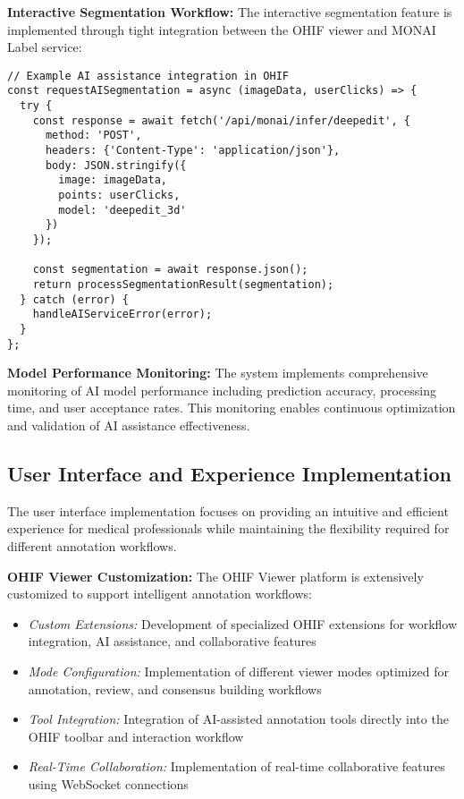 \textbf{Interactive Segmentation Workflow:} The interactive segmentation feature is implemented through tight integration between the OHIF viewer and MONAI Label service:

\begin{verbatim}
// Example AI assistance integration in OHIF
const requestAISegmentation = async (imageData, userClicks) => {
  try {
    const response = await fetch('/api/monai/infer/deepedit', {
      method: 'POST',
      headers: {'Content-Type': 'application/json'},
      body: JSON.stringify({
        image: imageData,
        points: userClicks,
        model: 'deepedit_3d'
      })
    });
    
    const segmentation = await response.json();
    return processSegmentationResult(segmentation);
  } catch (error) {
    handleAIServiceError(error);
  }
};
\end{verbatim}

\textbf{Model Performance Monitoring:} The system implements comprehensive monitoring of AI model performance including prediction accuracy, processing time, and user acceptance rates. This monitoring enables continuous optimization and validation of AI assistance effectiveness.

\subsection{User Interface and Experience Implementation}

The user interface implementation focuses on providing an intuitive and efficient experience for medical professionals while maintaining the flexibility required for different annotation workflows.

\textbf{OHIF Viewer Customization:} The OHIF Viewer platform \cite{ziegler2020open} is extensively customized to support intelligent annotation workflows:

\begin{itemize}
    \item \textit{Custom Extensions:} Development of specialized OHIF extensions for workflow integration, AI assistance, and collaborative features
    \item \textit{Mode Configuration:} Implementation of different viewer modes optimized for annotation, review, and consensus building workflows
    \item \textit{Tool Integration:} Integration of AI-assisted annotation tools directly into the OHIF toolbar and interaction workflow
    \item \textit{Real-Time Collaboration:} Implementation of real-time collaborative features using WebSocket connections
\end{itemize}

